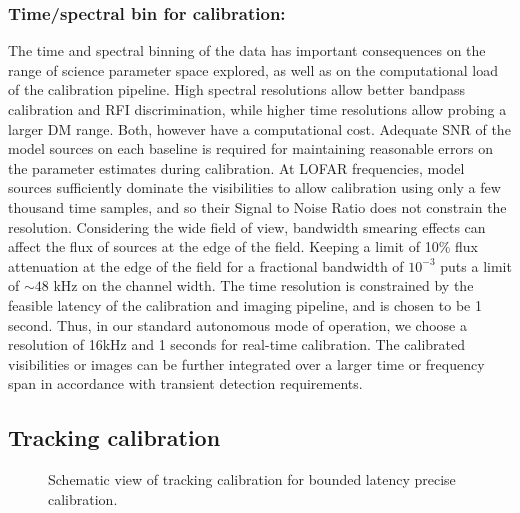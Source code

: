 \documentclass{aa}
\begin{document}
\subsubsection{Time/spectral bin for calibration:} 
The time  and spectral  binning of  the data has  important consequences  on the
range of science parameter space explored,  as well as on the computational load
of the  calibration pipeline.  High  spectral resolutions allow  better bandpass
calibration and RFI discrimination,  while higher time resolutions allow probing
a larger DM range.  Both, however have a computational cost. Adequate SNR of the
model sources on each baseline  is required for maintaining reasonable errors on
the parameter estimates during calibration.  At LOFAR frequencies, model sources
sufficiently dominate  the visibilities  to allow calibration  using only  a few
thousand time samples, and so their Signal to Noise Ratio does not constrain the
resolution.  Considering the wide field  of view, bandwidth smearing effects can
affect the  flux of sources at  the edge of the  field. Keeping a  limit of 10\%
flux  attenuation  at the  edge  of  the field  for  a  fractional bandwidth  of
$10^{-3}$  puts  a  limit of  $\sim48$  kHz  on  the  channel width.   The  time
resolution is constrained by the feasible latency of the calibration and imaging
pipeline, and is  chosen to be 1 second.  Thus, in  our standard autonomous mode
of  operation, we  choose a  resolution  of 16kHz  and 1  seconds for  real-time
calibration.  The calibrated visibilities  or images  can be  further integrated
over  a larger time  or frequency  span in  accordance with  transient detection
requirements.


\subsection{Tracking calibration}

\begin{figure}[tbh]

\caption{\label{fig:trackcalSchematic}Schematic view of tracking calibration
for bounded latency precise calibration.}
\end{figure}
\end{document}
